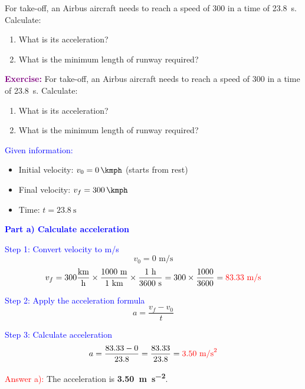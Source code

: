 \begin{exercise}
    For take-off, an Airbus aircraft needs to reach a speed of \qty{300}{\kmph} in a time of \qty{23.8}{\s}. Calculate:
    \begin{enumerate}[label=\letraminuscula]
    \item What is its acceleration?
    \item What is the minimum length of runway required?
    \end{enumerate}
    \begin{solu}
        \textbf{\textcolor{purple}{Exercise:}} For take-off, an Airbus aircraft needs to reach a speed of \qty{300}{\kmph} in a time of \qty{23.8}{\s}. Calculate:
        \begin{enumerate}[label=\letraminuscula]
            \item What is its acceleration?
            \item What is the minimum length of runway required?
        \end{enumerate}

        \vspace{0.3cm}

        \textcolor{blue}{Given information:}
        \begin{itemize}
            \item Initial velocity: $v_0 = \qty{0}{\kmph}$ (starts from rest)
            \item Final velocity: $v_f = \qty{300}{\kmph}$
            \item Time: $t = \qty{23.8}{\s}$
        \end{itemize}

        \textbf{\textcolor{blue}{Part a) Calculate acceleration}}

        \textcolor{blue}{Step 1: Convert velocity to m/s}
        \[
            v_0 = 0 \text{ m/s}
        \]
        \[
            v_f = 300 \frac{\text{km}}{\text{h}} \times \frac{1000 \text{ m}}{1 \text{ km}} \times \frac{1 \text{ h}}{3600 \text{ s}} = 300 \times \frac{1000}{3600} = \textcolor{red}{83.33 \text{ m/s}}
        \]

        \textcolor{blue}{Step 2: Apply the acceleration formula}
        \[
            \boxed{a = \frac{v_f - v_0}{t}}
        \]

        \textcolor{blue}{Step 3: Calculate acceleration}
        \[
            a = \frac{83.33 - 0}{23.8} = \frac{83.33}{23.8} = \textcolor{red}{3.50 \text{ m/s}^2}
        \]

        \textcolor{red}{Answer a):} The acceleration is \textbf{\qty{3.50}{\metre\per\second\squared}}.


\end{solu}
\end{exercise}
